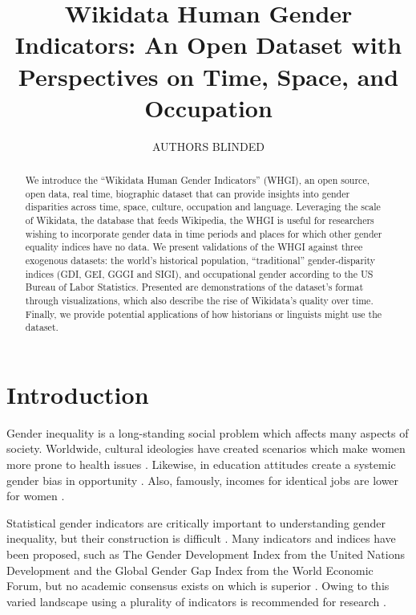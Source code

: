 \documentclass[letterpaper]{article}
\begin{document}
%
\title{Wikidata Human Gender Indicators: An Open Dataset with Perspectives on Time, Space, and Occupation}

\author{AUTHORS BLINDED}

\maketitle
\begin{abstract}
We introduce the ``Wikidata Human Gender Indicators'' (WHGI), an open source, open data, real time, biographic dataset that can provide insights into gender disparities across time, space, culture, occupation and language. Leveraging the scale of Wikidata, the database that feeds Wikipedia, the WHGI is useful for researchers wishing to incorporate gender data in time periods and places for which other gender equality indices have no data. We present validations of the WHGI against three exogenous datasets: the world's historical population, ``traditional'' gender-disparity indices (GDI, GEI, GGGI and SIGI), and occupational gender according to the US Bureau of Labor Statistics. Presented are demonstrations of the dataset's format through visualizations, which also describe the rise of Wikidata's quality over time. Finally, we provide potential applications of how historians or linguists might use the dataset.
\end{abstract}


\section{Introduction}

Gender inequality is a long-standing social problem which affects many aspects of society. Worldwide, cultural ideologies have created scenarios which make women more prone to health issues \cite{world_health_organization_women_2009}. Likewise, in education attitudes create a systemic gender bias in opportunity \cite{heward_gender_1999}. Also, famously, incomes for identical jobs are lower for women \cite{burstein_equal_????}.

Statistical gender indicators are critically important to understanding gender inequality, but their construction is difficult \cite{klasen_gender-related_2004}. Many indicators and indices have been proposed, such as The Gender Development Index from the United Nations Development and the Global Gender Gap Index from the World Economic Forum, but no academic consensus exists on which is superior \cite{hawken_cross-national_2012}. Owing to this varied landscape using a plurality of indicators is recommended for research \cite{jutting_measuring_2008}.
\end{document}
